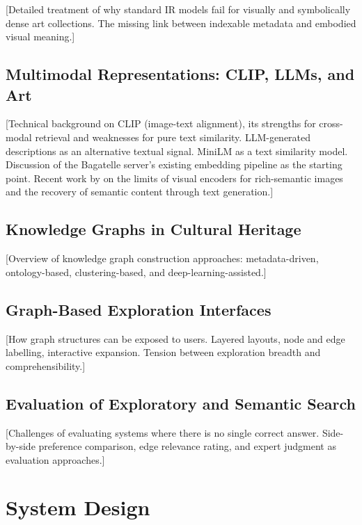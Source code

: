\documentclass[12pt, a4paper]{article}
\begin{document}
[Detailed treatment of why standard IR models fail for visually and symbolically dense art
collections. The missing link between indexable metadata and embodied visual meaning.]

\subsection{Multimodal Representations: CLIP, LLMs, and Art}

[Technical background on CLIP (image-text alignment), its strengths for cross-modal retrieval and
weaknesses for pure text similarity. LLM-generated descriptions as an alternative textual signal.
MiniLM as a text similarity model. Discussion of the Bagatelle server's existing embedding
pipeline as the starting point. Recent work by \citet{zhang2026} on the limits of visual encoders
for rich-semantic images and the recovery of semantic content through text generation.]

\subsection{Knowledge Graphs in Cultural Heritage}

[Overview of knowledge graph construction approaches: metadata-driven, ontology-based,
clustering-based, and deep-learning-assisted.]

\subsection{Graph-Based Exploration Interfaces}

[How graph structures can be exposed to users. Layered layouts, node and edge labelling,
interactive expansion. Tension between exploration breadth and comprehensibility.]

\subsection{Evaluation of Exploratory and Semantic Search}

[Challenges of evaluating systems where there is no single correct answer. Side-by-side preference
comparison, edge relevance rating, and expert judgment as evaluation approaches.]

\section{System Design}
\end{document}
